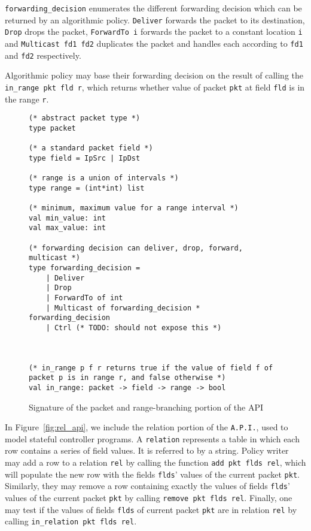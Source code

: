 \documentclass[preprint]{sigplanconf}
\begin{document}
\lstinline|forwarding_decision| enumerates the different forwarding decision which can be returned by an algorithmic policy. \lstinline|Deliver| forwards the packet to its destination, \lstinline|Drop| drops the packet, \lstinline|ForwardTo i| forwards the packet to a constant location \lstinline|i| and \lstinline|Multicast fd1 fd2| duplicates the packet and handles each according to \lstinline|fd1| and \lstinline|fd2| respectively.

Algorithmic policy may base their forwarding decision on the result of calling the \lstinline|in_range pkt fld r|, which returns whether value of packet \lstinline|pkt| at field \lstinline|fld| is in the range \lstinline|r|.

\begin{figure}[ht]
  \begin{lstlisting}
(* abstract packet type *)
type packet

(* a standard packet field *)
type field = IpSrc | IpDst 

(* range is a union of intervals *)
type range = (int*int) list

(* minimum, maximum value for a range interval *)
val min_value: int 
val max_value: int

(* forwarding decision can deliver, drop, forward, multicast *)
type forwarding_decision =
	| Deliver
	| Drop
	| ForwardTo of int
	| Multicast of forwarding_decision * forwarding_decision
	| Ctrl (* TODO: should not expose this *)



(* in_range p f r returns true if the value of field f of packet p is in range r, and false otherwise *)
val in_range: packet -> field -> range -> bool
\end{lstlisting}

\caption{Signature of the packet and range-branching portion of the API}
\label{fig:range_api}
\end{figure}



In Figure~\ref{fig:rel_api}, we include the relation portion of the \lstinline|A.P.I.|, used to model stateful controller programs. A \lstinline|relation| represents a table in which each row contains a series of field values. It is referred to by a string. Policy writer may add a row to a relation \lstinline|rel| by calling the function \lstinline|add pkt flds rel|, which will populate the new row with the fields \lstinline|flds|' values of the current packet \lstinline|pkt|. Similarly, they may remove a row containing exactly the values of fields \lstinline|flds|' values of the current packet \lstinline|pkt| by calling \lstinline|remove pkt flds rel|. Finally, one may test if the values of fields \lstinline|flds| of current packet \lstinline|pkt| are in relation \lstinline|rel| by calling \lstinline|in_relation pkt flds rel|.
\end{document}
